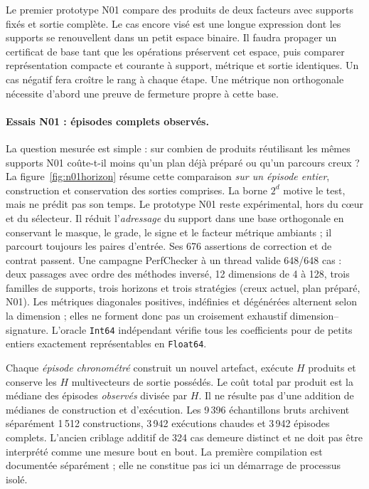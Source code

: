\documentclass[11pt,a4paper]{article}
\newcommand{\code}[1]{\texttt{#1}}
\begin{document}
Le premier prototype N01 compare des produits de deux facteurs avec
supports fixés et sortie complète. Le cas encore visé est une longue
expression dont les supports se renouvellent dans un petit espace binaire.
Il faudra propager un certificat de base tant que les opérations préservent
cet espace, puis comparer représentation compacte et courante à support,
métrique et sortie identiques. Un cas négatif fera croître le rang à chaque
étape. Une métrique non orthogonale nécessite d'abord une preuve de
fermeture propre à cette base.

\paragraph{Essais N01 : épisodes complets observés.}
\label{sec:n01perf}
La question mesurée est simple : sur combien de produits réutilisant les
mêmes supports N01 coûte-t-il moins qu'un plan déjà préparé ou qu'un
parcours creux ? La figure~\ref{fig:n01horizon} résume cette comparaison
\emph{sur un épisode entier}, construction et conservation des sorties
comprises. La borne $2^d$ motive le test, mais ne prédit pas son temps.
Le prototype N01 reste expérimental, hors du cœur et du
sélecteur. Il réduit l'\emph{adressage} du support dans
une base orthogonale en conservant le masque, le grade, le signe et le
facteur métrique ambiants ; il parcourt toujours les paires d'entrée.
Ses 676 assertions de correction et de contrat passent. Une campagne
PerfChecker à un thread valide 648/648 cas : deux passages avec ordre
des méthodes inversé, 12 dimensions de 4 à 128, trois familles de
supports, trois horizons et trois stratégies (creux actuel, plan
préparé, N01). Les métriques diagonales positives, indéfinies et
dégénérées alternent selon la dimension ; elles ne forment donc pas un
croisement exhaustif dimension--signature. L'oracle \code{Int64}
indépendant vérifie tous les coefficients pour de petits entiers
exactement représentables en \code{Float64}.

Chaque \emph{épisode chronométré} construit un nouvel artefact, exécute
$H$ produits et conserve les $H$ multivecteurs de sortie possédés. Le
coût total par produit est la médiane des épisodes \emph{observés}
divisée par $H$. Il ne résulte pas d'une addition de médianes de
construction et d'exécution. Les 9\,396 échantillons bruts archivent
séparément 1\,512 constructions, 3\,942 exécutions chaudes et 3\,942
épisodes complets. L'ancien criblage additif de 324 cas demeure
distinct et ne doit pas être interprété comme une mesure bout en bout.
La première compilation est documentée séparément ; elle ne constitue
pas ici un démarrage de processus isolé.
\end{document}

